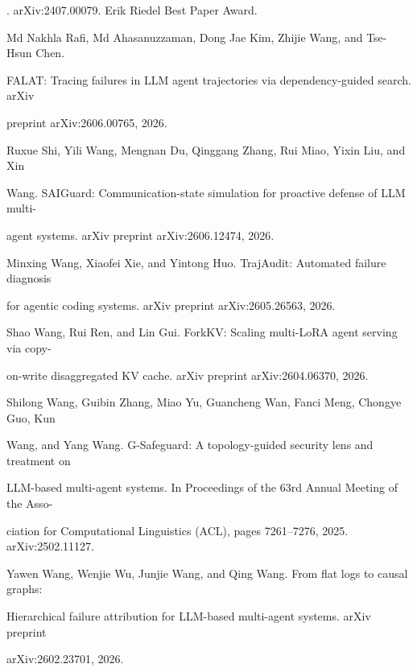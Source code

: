 \begin{flushleft}
. arXiv:2407.00079. Erik Riedel Best Paper Award.\par
\par\smallskip
\noindent [33] Md Nakhla Rafi, Md Ahasanuzzaman, Dong Jae Kim, Zhijie Wang, and Tse-Hsun Chen.\par
\noindent  FALAT: Tracing failures in LLM agent trajectories via dependency-guided search. arXiv\par
\noindent  preprint arXiv:2606.00765, 2026.\par
\par\smallskip
\noindent [34] Ruxue Shi, Yili Wang, Mengnan Du, Qinggang Zhang, Rui Miao, Yixin Liu, and Xin\par
\noindent  Wang. SAIGuard: Communication-state simulation for proactive defense of LLM multi-\par
\noindent  agent systems. arXiv preprint arXiv:2606.12474, 2026.\par
\par\smallskip
\noindent [35] Minxing Wang, Xiaofei Xie, and Yintong Huo. TrajAudit: Automated failure diagnosis\par
\noindent  for agentic coding systems. arXiv preprint arXiv:2605.26563, 2026.\par
\par\smallskip
\noindent [36] Shao Wang, Rui Ren, and Lin Gui. ForkKV: Scaling multi-LoRA agent serving via copy-\par
\noindent  on-write disaggregated KV cache. arXiv preprint arXiv:2604.06370, 2026.\par
\par\smallskip
\noindent [37] Shilong Wang, Guibin Zhang, Miao Yu, Guancheng Wan, Fanci Meng, Chongye Guo, Kun\par
\noindent  Wang, and Yang Wang. G-Safeguard: A topology-guided security lens and treatment on\par
\noindent  LLM-based multi-agent systems. In Proceedings of the 63rd Annual Meeting of the Asso-\par
\noindent  ciation for Computational Linguistics (ACL), pages 7261–7276, 2025. arXiv:2502.11127.\par
\par\smallskip
\noindent [38] Yawen Wang, Wenjie Wu, Junjie Wang, and Qing Wang. From flat logs to causal graphs:\par
\noindent  Hierarchical failure attribution for LLM-based multi-agent systems. arXiv preprint\par
\noindent  arXiv:2602.23701, 2026.\par

\end{flushleft}
